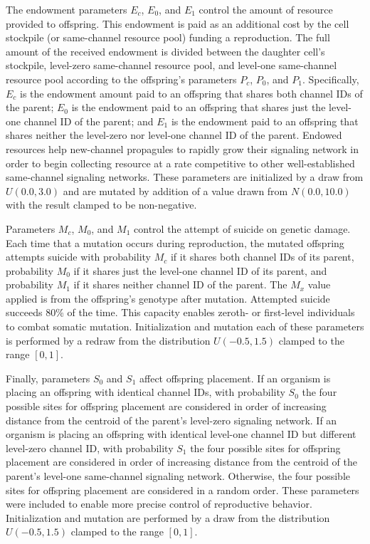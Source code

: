 The endowment parameters $E_{c}$, $E_0$, and $E_1$ control the amount of resource provided to offspring.
This endowment is paid as an additional cost by the cell stockpile (or same-channel resource pool) funding a reproduction.
The full amount of the received endowment is divided between the daughter cell's stockpile, level-zero same-channel resource pool, and level-one same-channel resource pool according to the offspring's parameters $P_{c}$, $P_0$, and $P_1$.
Specifically, $E_{c}$ is the endowment amount paid to an offspring that shares both channel IDs of the parent;
$E_0$ is the endowment paid to an offspring that shares just the level-one channel ID of the parent;
and $E_1$ is the endowment paid to an offspring that shares neither the level-zero nor level-one channel ID of the parent.
Endowed resources help new-channel propagules to rapidly grow their signaling network in order to begin collecting resource at a rate competitive to other well-established same-channel signaling networks.
These parameters are initialized by a draw from $U(0.0, 3.0)$ and are mutated by addition of a value drawn from $N(0.0,10.0)$ with the result clamped to be non-negative.

Parameters $M_{c}$, $M_0$, and $M_1$ control the attempt of suicide on genetic damage.
Each time that a mutation occurs during reproduction, the mutated offspring attempts suicide with probability $M_{c}$ if it shares both channel IDs of its parent, probability $M_0$ if it shares just the level-one channel ID of its parent, and probability $M_1$ if it shares neither channel ID of the parent.
The $M_x$ value applied is from the offspring's genotype after mutation.
Attempted suicide succeeds 80\% of the time.
This capacity enables zeroth- or first-level individuals to combat somatic mutation.
Initialization and mutation each of these parameters is performed by a redraw from the distribution $U(-0.5,1.5)$ clamped to the range $[0,1]$.

Finally, parameters $S_0$ and $S_1$ affect offspring placement.
If an organism is placing an offspring with identical channel IDs, with probability $S_0$ the four possible sites for offspring placement are considered in order of increasing distance from the centroid of the parent's level-zero signaling network.
If an organism is placing an offspring with identical level-one channel ID but different level-zero channel ID, with probability $S_1$ the four possible sites for offspring placement are considered in order of increasing distance from the centroid of the parent's level-one same-channel signaling network.
Otherwise, the four possible sites for offspring placement are considered in a random order.
These parameters were included to enable more precise control of reproductive behavior.
Initialization and mutation are performed by a draw from the distribution $U(-0.5,1.5)$ clamped to the range $[0,1]$.

